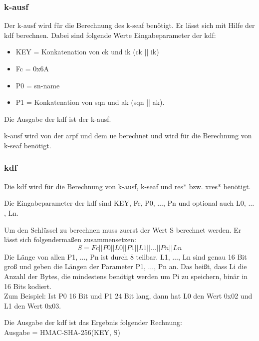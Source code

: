 \subsubsection{\gls{k-ausf}}
Der \gls{k-ausf} wird für die Berechnung des \gls{k-seaf} benötigt.
Er lässt sich mit Hilfe der \gls{kdf} berechnen.
Dabei sind folgende Werte Eingabeparameter der \gls{kdf}: %
\begin{itemize}
\item KEY = Konkatenation von \gls{ck} und \gls{ik} (\gls{ck} || \gls{ik})
\item Fc = 0x6A
\item P0 = \gls{sn-name}
\item P1 = Konkatenation von \gls{sqn} und \gls{ak} (\gls{sqn} || \gls{ak}).
\end{itemize}
Die Ausgabe der \gls{kdf} ist der \gls{k-ausf}.

\gls{k-ausf} wird von der \gls{arpf} und dem \gls{ue} berechnet und wird für die Berechnung von \gls{k-seaf} benötigt.

\subsubsection{\gls{kdf}}
Die \gls{kdf} wird für die Berechnung von \gls{k-ausf}, \gls{k-seaf} und \gls{res*} bzw. \gls{xres*} benötigt.

Die Eingabeparameter der \gls{kdf} sind KEY, Fc, P0, $ \dots $, Pn und optional auch L0, $ \dots $, Ln.

Um den Schlüssel zu berechnen muss zuerst der Wert S berechnet werden. %
Er l\"asst sich folgendermaßen zusammensetzen: 
\begin{equation*}
S = Fc || P0 || L0 || P1 || L1 || \dots || Pn || Ln 
\end{equation*}
Die Länge von allen P1, $ \dots $, Pn ist durch 8 teilbar. 
L1, $ \dots $, Ln sind genau 16 Bit groß und geben die Längen der Parameter P1, $ \dots $, Pn an. 
Das heißt, dass Li die Anzahl der Bytes, die mindestens benötigt werden um Pi zu speichern, binär in 16 Bits kodiert. \\
Zum Beispiel: Ist P0 16 Bit und P1 24 Bit lang, dann hat L0 den Wert 0x02 und L1 den Wert 0x03.

Die Ausgabe der \gls{kdf} ist das Ergebnis folgender Rechnung: \\
Ausgabe = HMAC-SHA-256(KEY, S) \\

